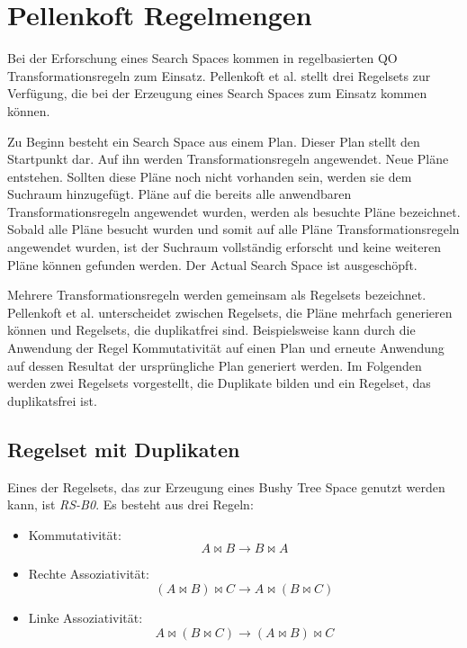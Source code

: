 \section{Pellenkoft Regelmengen}
\label{sec:pellenkoftRulesets}
Bei der Erforschung eines Search Spaces kommen in regelbasierten \ac{QO} Transformationsregeln zum Einsatz. Pellenkoft et al. \cite{pellenkoft1997duplicate} \cite{manegold2000multi} \cite{pellenkoft1997complexity} stellt drei Regelsets zur Verfügung, die bei der Erzeugung eines Search Spaces zum Einsatz kommen können.



Zu Beginn besteht ein Search Space aus einem Plan. Dieser Plan stellt den Startpunkt dar. Auf ihn werden Transformationsregeln angewendet. Neue Pläne entstehen. Sollten diese Pläne noch nicht vorhanden sein, werden sie dem Suchraum hinzugefügt. Pläne auf die bereits alle anwendbaren Transformationsregeln angewendet wurden, werden als besuchte Pläne bezeichnet. Sobald alle Pläne besucht wurden und somit auf alle Pläne Transformationsregeln angewendet wurden, ist der Suchraum vollständig erforscht und keine weiteren Pläne können gefunden werden. Der Actual Search Space ist ausgeschöpft.

Mehrere Transformationsregeln werden gemeinsam als Regelsets bezeichnet. Pellenkoft et al. unterscheidet zwischen Regelsets, die Pläne mehrfach generieren können und Regelsets, die duplikatfrei sind. Beispielsweise kann durch die Anwendung der Regel Kommutativität auf einen Plan und erneute Anwendung auf dessen Resultat  der ursprüngliche Plan generiert werden. Im Folgenden werden zwei Regelsets vorgestellt, die Duplikate bilden und ein Regelset, das duplikatsfrei ist.


\subsection{Regelset mit Duplikaten}

Eines der Regelsets, das zur Erzeugung eines Bushy Tree Space genutzt werden kann, ist \textit{RS-B0}. Es besteht aus drei Regeln:

\begin{itemize}
\item Kommutativität: $$ A \Join B \to B \Join A$$
\item Rechte Assoziativität: $$(A \Join B) \Join C \to A \Join (B \Join C) $$
\item Linke Assoziativität: $$A \Join (B \Join C) \to (A \Join B) \Join C$$
\end{itemize}

